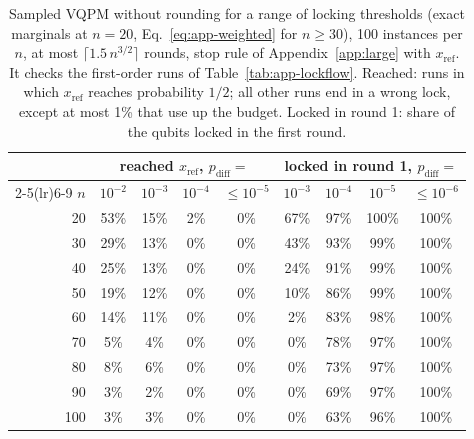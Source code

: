 \begin{table}[ht]
\centering
\small
\setlength{\tabcolsep}{4pt}
\caption{Sampled VQPM without rounding for a range of locking thresholds (exact marginals at $n=20$, Eq.~\eqref{eq:app-weighted} for $n\ge30$), 100 instances per $n$, at most $\lceil1.5\,n^{3/2}\rceil$ rounds, stop rule of Appendix~\ref{app:large} with $x_{\mathrm{ref}}$. It checks the first-order runs of Table~\ref{tab:app-lockflow}. Reached: runs in which $x_{\mathrm{ref}}$ reaches probability $1/2$; all other runs end in a wrong lock, except at most 1\% that use up the budget. Locked in round 1: share of the qubits locked in the first round.}
\label{tab:app-sweep}
\begin{tabular}{r cccc cccc}
\toprule
 & \multicolumn{4}{c}{reached $x_{\mathrm{ref}}$, $p_{\mathrm{diff}}=$} & \multicolumn{4}{c}{locked in round 1, $p_{\mathrm{diff}}=$} \\
\cmidrule(lr){2-5}\cmidrule(lr){6-9}
$n$ & $10^{-2}$ & $10^{-3}$ & $10^{-4}$ & $\le10^{-5}$ & $10^{-3}$ & $10^{-4}$ & $10^{-5}$ & $\le10^{-6}$ \\
\midrule
20 & 53\% & 15\% & 2\% & 0\% & 67\% & 97\% & 100\% & 100\% \\
30 & 29\% & 13\% & 0\% & 0\% & 43\% & 93\% & 99\% & 100\% \\
40 & 25\% & 13\% & 0\% & 0\% & 24\% & 91\% & 99\% & 100\% \\
50 & 19\% & 12\% & 0\% & 0\% & 10\% & 86\% & 99\% & 100\% \\
60 & 14\% & 11\% & 0\% & 0\% & 2\% & 83\% & 98\% & 100\% \\
70 & 5\% & 4\% & 0\% & 0\% & 0\% & 78\% & 97\% & 100\% \\
80 & 8\% & 6\% & 0\% & 0\% & 0\% & 73\% & 97\% & 100\% \\
90 & 3\% & 2\% & 0\% & 0\% & 0\% & 69\% & 97\% & 100\% \\
100 & 3\% & 3\% & 0\% & 0\% & 0\% & 63\% & 96\% & 100\% \\
\bottomrule
\end{tabular}
\end{table}
